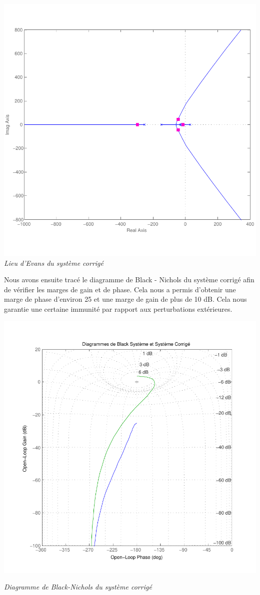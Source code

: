 \documentclass[11pt, french]{article} %
\begin{document}
\begin{center}
\includegraphics[scale=0.50]{RL_Sys_AvPh_K27.pdf}
\\
\emph{Lieu d'Evans du système corrigé}
\end{center}

Nous avons ensuite tracé le diagramme de Black - Nichols du système corrigé afin de vérifier les marges de gain et de phase. Cela nous a permis d'obtenir une marge de phase d'environ 25 et une marge de gain de plus de 10 dB. Cela nous garantie une certaine immunité par rapport aux perturbations extérieures.

\begin{center}
\includegraphics[scale=0.80]{MatBlackFredValues.pdf}

\emph{Diagramme de Black-Nichols du système corrigé}
\end{center}
\end{document}
